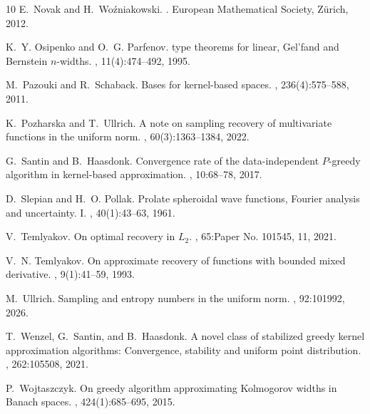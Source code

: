 \documentclass[11pt,reqno, a4paper]{article}
\numberwithin{equation}{section}
\begin{document}
\begin{thebibliography}{10}
E.~Novak and H.~Wo\'zniakowski.
.
\newblock European Mathematical Society, Z\"urich, 2012.

K.~Y. Osipenko and O.~G. Parfenov.
 type theorems for linear, {Gel'fand} and {Bernstein}
  {$n$}-widths.
, 11(4):474--492, 1995.

M.~Pazouki and R.~Schaback.
\newblock Bases for kernel-based spaces.
,
  236(4):575--588, 2011.

K.~Pozharska and T.~Ullrich.
\newblock A note on sampling recovery of multivariate functions in the uniform
  norm.
, 60(3):1363--1384, 2022.

G.~Santin and B.~Haasdonk.
\newblock Convergence rate of the data-independent {$P$}-greedy algorithm in
  kernel-based approximation.
, 10:68--78, 2017.

D.~Slepian and H.~O. Pollak.
\newblock Prolate spheroidal wave functions, {F}ourier analysis and
  uncertainty. {I}.
, 40(1):43--63, 1961.

V.~Temlyakov.
\newblock On optimal recovery in {$L_2$}.
, 65:Paper No. 101545, 11, 2021.

V.~N. Temlyakov.
\newblock On approximate recovery of functions with bounded mixed derivative.
, 9(1):41--59, 1993.

M.~Ullrich.
\newblock Sampling and entropy numbers in the uniform norm.
, 92:101992, 2026.

T.~Wenzel, G.~Santin, and B.~Haasdonk.
\newblock A novel class of stabilized greedy kernel approximation algorithms:
  Convergence, stability and uniform point distribution.
, 262:105508, 2021.

P.~Wojtaszczyk.
\newblock On greedy algorithm approximating {Kolmogorov} widths in {Banach}
  spaces.
,
  424(1):685--695, 2015.

\end{thebibliography}
\end{document}
